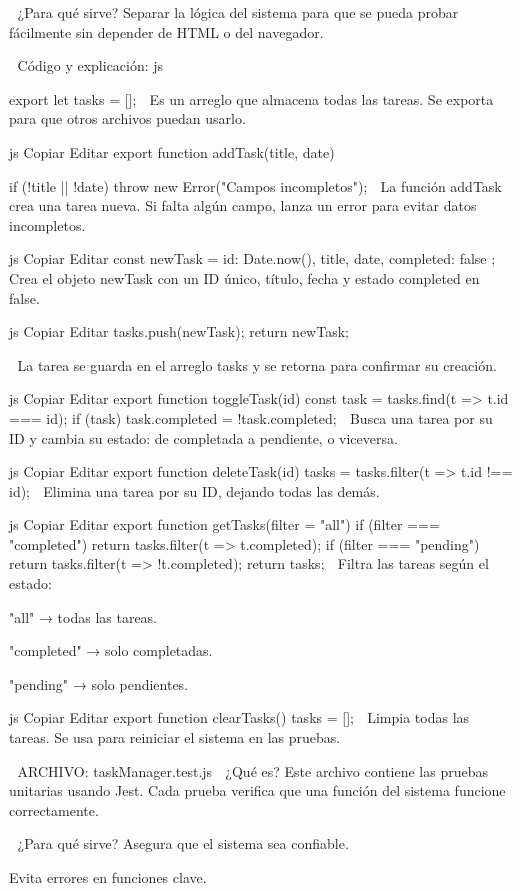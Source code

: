 🧠 ¿Para qué sirve?
Separar la lógica del sistema para que se pueda probar fácilmente sin depender de HTML o del navegador.

📄 Código y explicación:
js

export let tasks = [];
📌 Es un arreglo que almacena todas las tareas. Se exporta para que otros archivos puedan usarlo.

js
Copiar
Editar
export function addTask(title, date) {
  if (!title || !date) throw new Error("Campos incompletos");
📌 La función addTask crea una tarea nueva. Si falta algún campo, lanza un error para evitar datos incompletos.

js
Copiar
Editar
  const newTask = {
    id: Date.now(),
    title,
    date,
    completed: false
  };
📌 Crea el objeto newTask con un ID único, título, fecha y estado completed en false.

js
Copiar
Editar
  tasks.push(newTask);
  return newTask;
}
📌 La tarea se guarda en el arreglo tasks y se retorna para confirmar su creación.

js
Copiar
Editar
export function toggleTask(id) {
  const task = tasks.find(t => t.id === id);
  if (task) task.completed = !task.completed;
}
📌 Busca una tarea por su ID y cambia su estado: de completada a pendiente, o viceversa.

js
Copiar
Editar
export function deleteTask(id) {
  tasks = tasks.filter(t => t.id !== id);
}
📌 Elimina una tarea por su ID, dejando todas las demás.

js
Copiar
Editar
export function getTasks(filter = "all") {
  if (filter === "completed") return tasks.filter(t => t.completed);
  if (filter === "pending") return tasks.filter(t => !t.completed);
  return tasks;
}
📌 Filtra las tareas según el estado:

"all" → todas las tareas.

"completed" → solo completadas.

"pending" → solo pendientes.

js
Copiar
Editar
export function clearTasks() {
  tasks = [];
}
📌 Limpia todas las tareas. Se usa para reiniciar el sistema en las pruebas.

📄 ARCHIVO: taskManager.test.js
📌 ¿Qué es?
Este archivo contiene las pruebas unitarias usando Jest.
Cada prueba verifica que una función del sistema funcione correctamente.

🧠 ¿Para qué sirve?
Asegura que el sistema sea confiable.

Evita errores en funciones clave.

